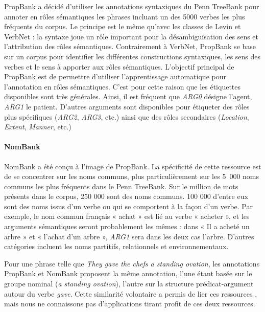 PropBank \citep{palmer2005proposition} a décidé d'utiliser les annotations
syntaxiques du Penn TreeBank \citep{marcus1993building} pour annoter en rôles
sémantiques les phrases incluant un des 5000 verbes les plus fréquents du
corpus. Le principe est le même qu'avec les classes de Levin et VerbNet : la
syntaxe joue un rôle important pour la désambiguïsation des sens et
l'attribution des rôles sémantiques. Contrairement à VerbNet, PropBank se base
sur un corpus pour identifier les différentes constructions syntaxiques, les
sens des verbes et le sens à apporter aux rôles sémantiques. L'objectif
principal de PropBank est de permettre d'utiliser l'apprentissage automatique
pour l'annotation en rôles sémantiques. C'est pour cette raison que les
étiquettes disponibles sont très générales. Ainsi, il est fréquent que
\textit{ARG0} désigne l'agent, \textit{ARG1} le patient. D'autres arguments
sont disponibles pour étiqueter des rôles plus spécifiques (\textit{ARG2},
\textit{ARG3}, etc.) ainsi que des rôles secondaires (\textit{Location},
\textit{Extent}, \textit{Manner}, etc.)

\paragraph{NomBank}

NomBank \citep{meyers2004nombank} a été conçu à l'image de PropBank. La
spécificité de cette ressource est de se concentrer sur les noms communs, plus
particulièrement sur les 5~000 noms communs les plus fréquents dans le Penn
TreeBank. Sur le million de mots présents dans le corpus, 250 000 sont des noms
communs. 100 000 d'entre eux sont des noms issus d'un verbe ou qui se
comportent à la façon d'un verbe. Par exemple, le nom commun français « achat »
est lié au verbe « acheter », et les arguments sémantiques seront probablement
les mêmes : dans « Il a acheté un arbre » et « l'achat d'un arbre »,
\textit{ARG1} sera dans les deux cas l'arbre. D'autres catégories incluent les
noms partitifs, relationnels et environnementaux.

Pour une phrase telle que \textit{They gave the chefs a standing ovation}, les
annotations PropBank et NomBank proposent la même annotation, l'une étant basée
sur le groupe nominal (\textit{a standing ovation}), l'autre sur la structure
prédicat-argument autour du verbe \textit{gave}. Cette similarité volontaire a
permis de lier ces ressources
\citep{pustejovsky2005merging,verhagen2007combining}, mais nous ne connaissons
pas d'applications tirant profit de ces deux ressources.

